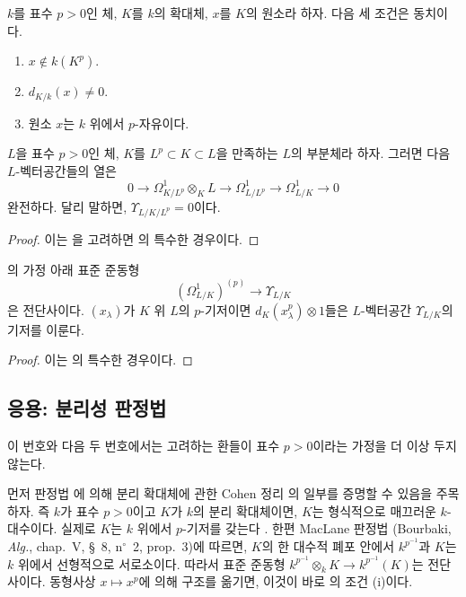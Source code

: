 \begin{corollary}[21.4.6]
\label{0.21.4.6-ko}
$k$를 표수 $p>0$인 체, $K$를 $k$의 확대체, $x$를 $K$의 원소라
하자. 다음 세 조건은 동치이다.
\begin{enumerate}
  \item[a)] $x\notin k(K^p)$.
  \item[b)] $d_{K/k}(x)\neq0$.
  \item[c)] 원소 $x$는 $k$ 위에서 $p$-자유이다.
\end{enumerate}
\end{corollary}

\begin{proposition}[21.4.7]
\label{0.21.4.7-ko}
$L$을 표수 $p>0$인 체, $K$를 $L^p\subset K\subset L$을 만족하는
$L$의 부분체라 하자. 그러면 다음 $L$-벡터공간들의 열은
\begin{equation}
\tag{21.4.7.1}\label{0.21.4.7.1-ko}
0\to\Omega^1_{K/L^p}\otimes_KL\to\Omega^1_{L/L^p}
\to\Omega^1_{L/K}\to0
\end{equation}
완전하다. 달리 말하면, $\Upsilon_{L/K/L^p}=0$이다.
\end{proposition}

\begin{proof}
이는 을 고려하면 의 특수한
경우이다.
\end{proof}

\begin{proposition}[21.4.8]
\label{0.21.4.8-ko}
의 가정 아래 표준 준동형
\begin{equation}
\tag{21.4.8.1}\label{0.21.4.8.1-ko}
(\Omega^1_{L/K})^{(p)}\longrightarrow\Upsilon_{L/K}
\end{equation}
은 전단사이다. $(x_\lambda)$가 $K$ 위 $L$의 $p$-기저이면
$d_K(x_\lambda^p)\otimes1$들은 $L$-벡터공간
$\Upsilon_{L/K}$의 기저를 이룬다.
\end{proposition}

\begin{proof}
이는 의 특수한 경우이다.
\end{proof}

\subsection{응용: 분리성 판정법}
\label{0.21.5-ko}

이 번호와 다음 두 번호에서는 고려하는 환들이 표수 $p>0$이라는
가정을 더 이상 두지 않는다.

\begin{env}[21.5.1]
\label{0.21.5.1-ko}
먼저 판정법 에 의해 분리 확대체에 관한 Cohen 정리
의 일부를 증명할 수 있음을 주목하자. 즉 $k$가
표수 $p>0$이고 $K$가 $k$의 분리 확대체이면, $K$는 형식적으로
매끄러운 $k$-대수이다. 실제로 $K$는 $k$ 위에서 $p$-기저를
갖는다 . 한편 MacLane 판정법
(Bourbaki, \emph{Alg.}, chap.~V, §~8, n$^\circ$~2, prop.~3)에
따르면, $K$의 한 대수적 폐포 안에서 $k^{p^{-1}}$과 $K$는 $k$ 위에서
선형적으로 서로소이다. 따라서 표준 준동형
$k^{p^{-1}}\otimes_k K\to k^{p^{-1}}(K)$는 전단사이다. 동형사상
$x\mapsto x^p$에 의해 구조를 옮기면, 이것이 바로
의 조건 (i)이다.
\end{env}

